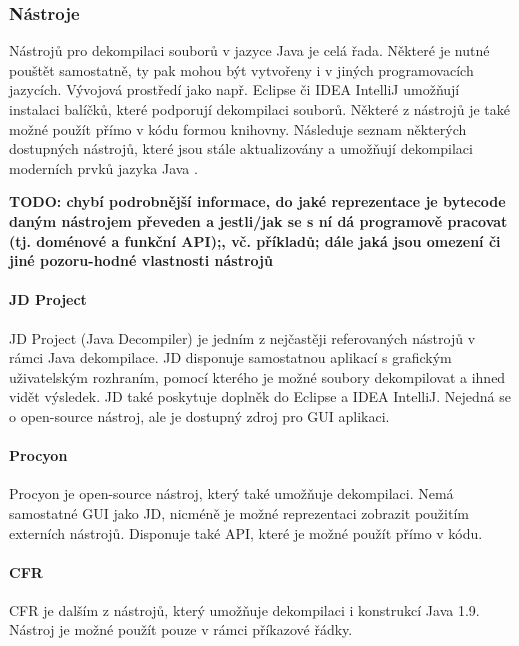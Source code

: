 			\subsubsection{Nástroje}
				Nástrojů pro dekompilaci souborů v jazyce Java je celá řada. Některé je nutné pouštět samostatně, ty pak mohou být vytvořeny i v jiných programovacích jazycích. Vývojová prostředí jako např. Eclipse či IDEA IntelliJ umožňují instalaci balíčků, které podporují dekompilaci souborů. Některé z nástrojů je také možné použít přímo v kódu formou knihovny. Následuje seznam některých dostupných nástrojů, které jsou stále aktualizovány a umožňují dekompilaci moderních prvků jazyka Java \cite{top8decompilers}\cite{decompilersOnline}\cite{quickDecompilers}.
				
				\textbf{\textcolor{pblue}{TODO:
				chybí podrobnější informace, do jaké reprezentace je bytecode daným nástrojem převeden a jestli/jak se s ní dá programově pracovat (tj. doménové a funkční API);, vč. příkladů; dále jaká jsou omezení či jiné pozoru-hodné vlastnosti nástrojů	 }}\\			
				
				\paragraph{JD Project}
					JD Project (Java Decompiler) \cite{jd} je jedním z nejčastěji referovaných nástrojů v rámci Java dekompilace. JD disponuje samostatnou aplikací s grafickým uživatelským rozhraním, pomocí kterého je možné soubory dekompilovat a ihned vidět výsledek. JD také poskytuje doplněk do Eclipse a IDEA IntelliJ. Nejedná se o open-source nástroj, ale je dostupný zdroj pro GUI aplikaci.
					
				\paragraph{Procyon}
					Procyon \cite{procyon} je open-source nástroj, který také umožňuje dekompilaci. Nemá samostatné GUI jako JD, nicméně je možné reprezentaci zobrazit použitím externích nástrojů. Disponuje také API, které je možné použít přímo v kódu.
					
				\paragraph{CFR}
					CFR \cite{cfr} je dalším z nástrojů, který umožňuje dekompilaci i konstrukcí Java 1.9. Nástroj je možné použít pouze v rámci příkazové řádky.\\
					
